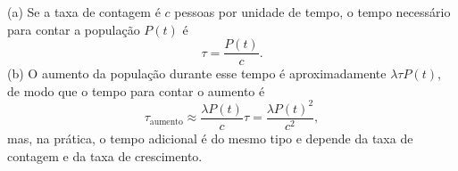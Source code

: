 (a) Se a taxa de contagem é $c$ pessoas por unidade de tempo, o tempo necessário para contar a população $P(t)$ é
\[
\tau = \frac{P(t)}{c}.
\]
(b) O aumento da população durante esse tempo é aproximadamente $\lambda\tau P(t)$, de modo que o tempo para contar o aumento é
\[
\tau_{\text{aumento}} \approx \frac{\lambda P(t)}{c} \tau = \frac{\lambda P(t)^{2}}{c^{2}},
\]
mas, na prática, o tempo adicional é do mesmo tipo e depende da taxa de contagem e da taxa de crescimento. 